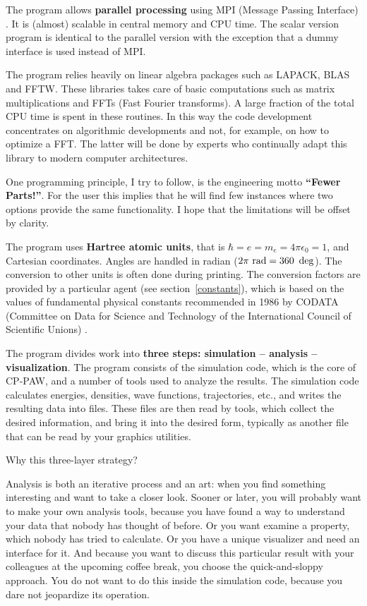 \documentclass[final,12pt]{article}
\begin{document}
The program allows {\bf parallel processing} using MPI (Message
Passing Interface) \cite{mpi}. It is (almost) scalable in central
memory and CPU time.  The scalar version program is identical to the
parallel version with the exception that a dummy interface is used
instead of MPI.

The program relies heavily on linear algebra packages such as LAPACK,
BLAS and FFTW. These libraries takes care of basic computations such
as matrix multiplications and FFTs (Fast Fourier transforms). A large
fraction of the total CPU time is spent in these routines. In this way
the code development concentrates on algorithmic developments and not,
for example, on how to optimize a FFT.  The latter will be done by
experts who continually adapt this library to modern computer
architectures.

One programming principle, I try to follow, is the engineering
motto {\bf ``Fewer Parts!''}. For the user this implies that he will
find few instances where two options provide the same functionality. I
hope that the limitations will be offset by clarity.

The program uses \textbf{Hartree atomic units}, that is $\hbar=e=m_e=4\pi\epsilon_0=1$, and Cartesian
coordinates.  Angles are handled in radian ($2\pi{\rm\ rad}=
360~\deg$).  The conversion to other units is often done during
printing. The conversion factors are provided by a particular agent
(see section~\ref{constants}), which is based on the values of
fundamental physical constants recommended in 1986 by CODATA
(Committee on Data for Science and Technology of the International
Council of Scientific Unions) \cite{mohr00_rmp72_351}.

The program divides work into {\bf three steps: simulation --
  analysis -- visualization}.  The program consists of the simulation
code, which is the core of CP-PAW, and a number of tools used to
analyze the results.  The simulation code calculates energies,
densities, wave functions, trajectories, etc., and writes the
resulting data into files.  These files are then read by tools, which
collect the desired information, and bring it into the desired
form, typically as another file that can be read by your graphics
utilities.

Why this three-layer strategy?

Analysis is both an iterative process and an art: when you find something
interesting and want to take a closer look. Sooner or later, you will
probably want to make your own analysis tools, because you have found a way
to understand your data that nobody has thought of before. Or you
want examine a property, which nobody has tried to calculate. Or
you have a unique visualizer and need an interface for it.  And
because you want to discuss this particular result with your colleagues
at the upcoming coffee break, you choose the quick-and-sloppy
approach.  You do not want to do this inside the simulation code,
because you dare not jeopardize its operation.
\end{document}
